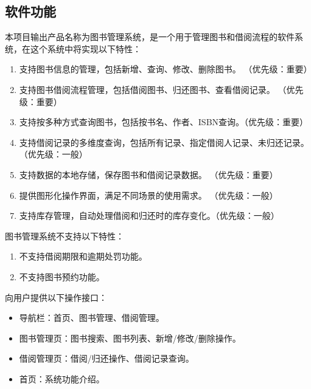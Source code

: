 \documentclass[UTF-8]{ctexart}
\begin{document}
\subsection{软件功能}
本项目输出产品名称为图书管理系统，是一个用于管理图书和借阅流程的软件系统，在这个系统中将实现以下特性：
\begin{enumerate}[label=\arabic{enumi}、]
\item 支持图书信息的管理，包括新增、查询、修改、删除图书。 （优先级：重要）
\item 支持图书借阅流程管理，包括借阅图书、归还图书、查看借阅记录。 （优先级：重要）
\item 支持按多种方式查询图书，包括按书名、作者、ISBN查询。（优先级：重要）
\item 支持借阅记录的多维度查询，包括所有记录、指定借阅人记录、未归还记录。 （优先级：一般）
\item 支持数据的本地存储，保存图书和借阅记录数据。 （优先级：重要）
\item 提供图形化操作界面，满足不同场景的使用需求。 （优先级：一般）
\item 支持库存管理，自动处理借阅和归还时的库存变化。（优先级：一般）
\end{enumerate}

图书管理系统不支持以下特性： 
\begin{enumerate}[label=\arabic{enumi}、]
\item 不支持借阅期限和逾期处罚功能。 
\item 不支持图书预约功能。 
\end{enumerate}

向用户提供以下操作接口：
\begin{itemize}
\item 导航栏：首页、图书管理、借阅管理。
\item 图书管理页：图书搜索、图书列表、新增/修改/删除操作。
\item 借阅管理页：借阅/归还操作、借阅记录查询。
\item 首页：系统功能介绍。
\end{itemize}
\end{document}
